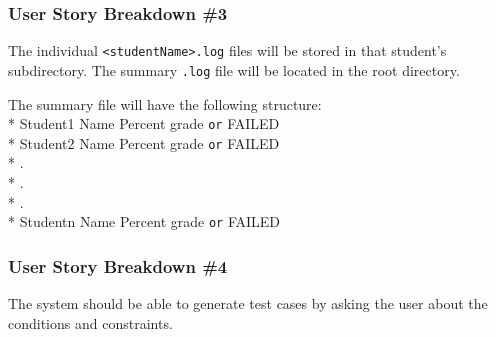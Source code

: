 \subsubsection{User Story Breakdown \#3}
The individual {\tt <studentName>.log} files will be stored in that student's subdirectory. The summary {\tt .log} file will be located in the root directory.  

The summary file will have the following structure: \\*
\newline
\indent	Student1 Name	\indent Percent grade {\tt or} FAILED \\*
\indent	Student2 Name	\indent Percent grade {\tt or} FAILED \\*
\indent \indent \indent \indent \indent \indent	.				 \\*
\indent \indent \indent \indent \indent \indent	.				 \\*
\indent \indent \indent \indent \indent \indent	.				 \\*
\indent	Studentn Name	\indent Percent grade {\tt or} FAILED
	

\subsubsection{User Story Breakdown \#4}
The system should be able to generate test cases by asking the user about the conditions and constraints.

\let\cleardoublepage\clearpage

